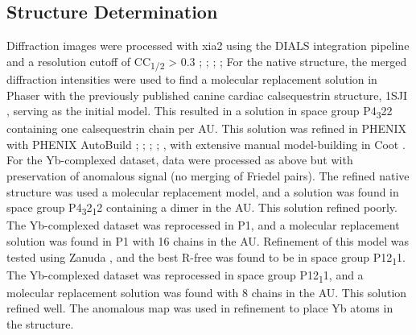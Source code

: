 \subsection*{Structure Determination}
Diffraction images were processed with xia2 using the DIALS integration pipeline and a resolution cutoff of CC\textsubscript{1/2} > 0.3 \cite{Winter2018-oa}; \cite{Winter2010-tx}; \cite{Evans2013-wu}; \cite{Evans2006-cc}; \cite{Winn2011-fi} For the native structure, the merged diffraction intensities were used to find a molecular replacement solution in Phaser \cite{McCoy2007-rr} with the previously published canine cardiac calsequestrin structure, 1SJI \cite{Park2004-bu}, serving as the initial model. This resulted in a solution in space group P4\textsubscript{3}22 containing one calsequestrin chain per AU. This solution was refined in PHENIX \cite{Adams2010-qs} with PHENIX AutoBuild \cite{Adams2010-qs}; \cite{Afonine2012-xn}; \cite{Terwilliger2004-hs}; \cite{Terwilliger2008-zf}; \cite{Zwart2005-kc}, with extensive manual model-building in Coot \cite{Emsley2010-il}. For the Yb-complexed dataset, data were processed as above but with preservation of anomalous signal (no merging of Friedel pairs). The refined native structure was used a molecular replacement model, and a solution was found in space group P4\textsubscript{3}2\textsubscript{1}2 containing a dimer in the AU. This solution refined poorly. The Yb-complexed dataset was reprocessed in P1, and a molecular replacement solution was found in P1 with 16 chains in the AU. Refinement of this model was tested using Zanuda \cite{Lebedev2014-po}, and the best R-free was found to be in space group P12\textsubscript{1}1. The Yb-complexed dataset was reprocessed in space group P12\textsubscript{1}1, and a molecular replacement solution was found with 8 chains in the AU. This solution refined well. The anomalous map was used in refinement to place Yb atoms in the structure.

